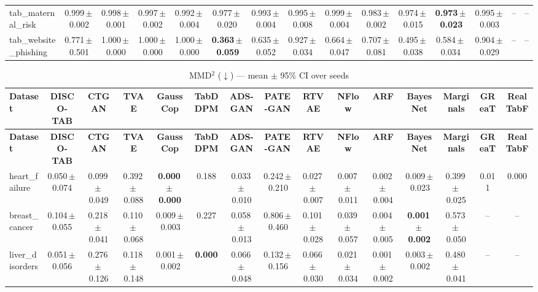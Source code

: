 \documentclass[8pt]{extarticle}
\begin{document}
\begin{longtable}{l*{14}{c}}
tab\_maternal\_risk & 0.999\,$\pm$\,0.002 & 0.998\,$\pm$\,0.001 & 0.997\,$\pm$\,0.002 & 0.992\,$\pm$\,0.004 & 0.977\,$\pm$\,0.020 & 0.993\,$\pm$\,0.004 & 0.995\,$\pm$\,0.008 & 0.999\,$\pm$\,0.004 & 0.983\,$\pm$\,0.002 & 0.974\,$\pm$\,0.015 & \textbf{0.973\,$\pm$\,0.023} & 0.995\,$\pm$\,0.003 & -- & -- \\
tab\_website\_phishing & 0.771\,$\pm$\,0.501 & 1.000\,$\pm$\,0.000 & 1.000\,$\pm$\,0.000 & 1.000\,$\pm$\,0.000 & \textbf{0.363\,$\pm$\,0.059} & 0.635\,$\pm$\,0.052 & 0.927\,$\pm$\,0.034 & 0.664\,$\pm$\,0.047 & 0.707\,$\pm$\,0.081 & 0.495\,$\pm$\,0.038 & 0.584\,$\pm$\,0.034 & 0.904\,$\pm$\,0.029 & -- & -- \\
\end{longtable}
\begin{longtable}{l*{14}{c}}
\caption{MMD$^2$ ($\downarrow$) --- mean $\pm$ 95\% CI over seeds}\\
\toprule
\textbf{Dataset} & \textbf{DISCO-TAB} & \textbf{CTGAN} & \textbf{TVAE} & \textbf{GaussCop} & \textbf{TabDDPM} & \textbf{ADS-GAN} & \textbf{PATE-GAN} & \textbf{RTVAE} & \textbf{NFlow} & \textbf{ARF} & \textbf{BayesNet} & \textbf{Marginals} & \textbf{GReaT} & \textbf{RealTabF} \\
\midrule
\endfirsthead
\toprule
\textbf{Dataset} & \textbf{DISCO-TAB} & \textbf{CTGAN} & \textbf{TVAE} & \textbf{GaussCop} & \textbf{TabDDPM} & \textbf{ADS-GAN} & \textbf{PATE-GAN} & \textbf{RTVAE} & \textbf{NFlow} & \textbf{ARF} & \textbf{BayesNet} & \textbf{Marginals} & \textbf{GReaT} & \textbf{RealTabF} \\
\midrule
\endhead
\bottomrule
\endfoot
heart\_failure & 0.050\,$\pm$\,0.074 & 0.099\,$\pm$\,0.049 & 0.392\,$\pm$\,0.088 & \textbf{0.000\,$\pm$\,0.000} & 0.188 & 0.033\,$\pm$\,0.010 & 0.242\,$\pm$\,0.210 & 0.027\,$\pm$\,0.007 & 0.007\,$\pm$\,0.011 & 0.002\,$\pm$\,0.004 & 0.009\,$\pm$\,0.023 & 0.399\,$\pm$\,0.025 & 0.011 & 0.000 \\
breast\_cancer & 0.104\,$\pm$\,0.055 & 0.218\,$\pm$\,0.041 & 0.110\,$\pm$\,0.068 & 0.009\,$\pm$\,0.003 & 0.227 & 0.058\,$\pm$\,0.013 & 0.806\,$\pm$\,0.460 & 0.101\,$\pm$\,0.028 & 0.039\,$\pm$\,0.057 & 0.004\,$\pm$\,0.005 & \textbf{0.001\,$\pm$\,0.002} & 0.573\,$\pm$\,0.050 & -- & -- \\
liver\_disorders & 0.051\,$\pm$\,0.056 & 0.276\,$\pm$\,0.126 & 0.118\,$\pm$\,0.148 & 0.001\,$\pm$\,0.002 & \textbf{0.000} & 0.066\,$\pm$\,0.048 & 0.132\,$\pm$\,0.156 & 0.066\,$\pm$\,0.030 & 0.021\,$\pm$\,0.034 & 0.001\,$\pm$\,0.002 & 0.003\,$\pm$\,0.002 & 0.480\,$\pm$\,0.041 & -- & -- \\

\end{longtable}
\end{document}
